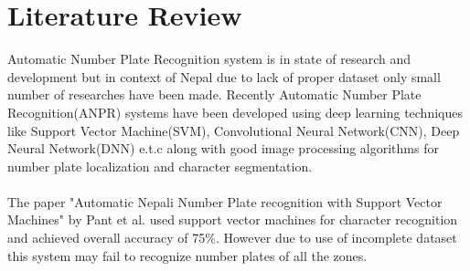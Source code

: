\chapter{Literature Review}
Automatic Number Plate Recognition system is in state of research and development but in context of Nepal due to lack of proper dataset only small number of researches have been made. Recently Automatic Number Plate Recognition(ANPR) systems have been developed using deep learning techniques like Support Vector Machine(SVM), Convolutional Neural Network(CNN), Deep Neural Network(DNN) e.t.c along with good image processing algorithms for number plate localization and character segmentation.\\\\
The paper "Automatic Nepali Number Plate recognition with Support Vector Machines" by Pant et al. \cite{pant2015automatic} used support vector machines for character recognition and achieved overall accuracy of 75\%. However due to use of incomplete dataset this system may fail to recognize number plates of all the zones.

